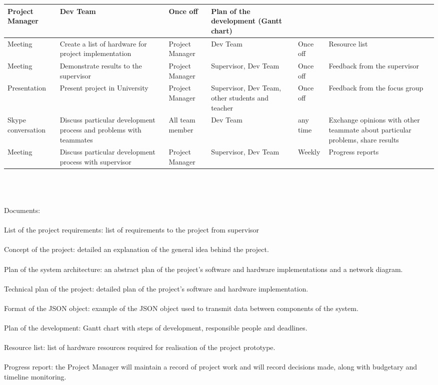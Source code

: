 \documentclass[english]{article}
\begin{document}
\begin{tabular}{|p{3cm}|p{5cm}|p{3cm}|p{4cm}|p{1.5cm}|p{5cm}|}
Project Manager &
Dev Team &
Once off &
Plan of the development (Gantt chart)\\
\hline 
Meeting & 
Create a list of hardware for project implementation &
Project Manager &
Dev Team &
Once off &
Resource list\\
\hline 
Meeting & 
Demonstrate results to the supervisor &
Project Manager &
Supervisor, Dev Team &
Once off &
Feedback from the supervisor\\
\hline 
Presentation & 
Present project in University &
Project Manager &
Supervisor, Dev Team, other students and teacher &
Once off &
Feedback from the focus group \\
\hline 
Skype conversation & 
Discuss particular development process and problems with teammates &
All team member &
Dev Team &
any time &
Exchange opinions with other teammate about particular problems, share results \\
\hline 
Meeting & 
Discuss particular development process with supervisor &
Project Manager &
Supervisor, Dev Team &
Weekly &
Progress reports\\
\hline 
\end{tabular}
\\\\\\
Documents: 
\\\\
List of the project requirements: list of requirements to the project from supervisor
\\\\
Concept of the project: detailed an explanation of the general idea behind the project.
\\\\
Plan of the system architecture: an abstract plan of the project's software and hardware implementations and a network diagram.
\\\\
Technical plan of the project: detailed plan of the project's software and hardware implementation.
\\\\
Format of the JSON object: example of the JSON object used to transmit data between components of the system.
\\\\
Plan of the development: Gantt chart with steps of development, responsible people and deadlines.
\\\\
Resource list: list of hardware resources required for realisation of the project prototype.
\\\\
Progress report: the Project Manager will maintain a record of project work and will record decisions made, along with budgetary and timeline monitoring.
\end{document}
